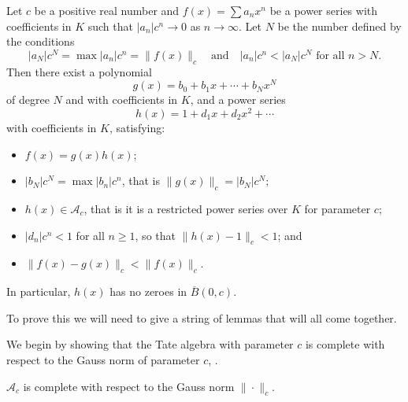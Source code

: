 \begin{theorem}\label{WP}
    Let $c$ be a positive real number and $f (x) = \sum a_n x^n$ be a power series with coefficients
    in $K$ such that $ \lvert a_n \rvert c^n \to 0$ as $n \to \infty$. Let $N$ be the number defined
    by the conditions
    \[
    \lvert a_N \rvert c^N = \max \lvert a_n \rvert c^n = \|f(x)\|_c \quad \text{and} \quad
    \lvert a_n \rvert c^n < \lvert a_N \rvert c^N \text{ for all } n > N.
    \]
    Then there exist a polynomial
    \[
    g(x) = b_0 + b_1x + \cdots + b_N x^N
    \]
    of degree $N$ and with coefficients in $K$, and a power series
    \[
    h(x) = 1 + d_1 x + d_2 x^2 + \cdots
    \]
    with coefficients in $K$, satisfying:
    \begin{itemize}
        \item $f(x) = g(x) h(x)$;
        \item $\lvert b_N \rvert c^N = \max \lvert b_n \rvert c^n$, that is
        $\| g (x) \|_c = \lvert b_N \rvert c^N$;
        \item $h(x) \in \mathcal{A}_c$, that is it is a restricted power series over $K$ for
        parameter $c$;
        \item $\lvert d_n \rvert c^n < 1$ for all $n \geq 1$, so that $\| h(x) - 1 \|_c < 1$; and
        \item $\| f(x) - g(x) \|_c < \| f(x)\|_c.$
    \end{itemize}
    In particular, $h(x)$ has no zeroes in $\overline{B}(0,c)$.
\end{theorem}

To prove this we will need to give a string of lemmas that will all come together.

We begin by showing that the Tate algebra with parameter $c$ is complete with respect to the Gauss
norm of parameter $c$, \cite[Lemma~7.2.7]{Gouvea}.

\begin{lemma}
    $\mathcal{A}_c$ is complete with respect to the Gauss norm $\|\cdot \|_c$.
\end{lemma}


